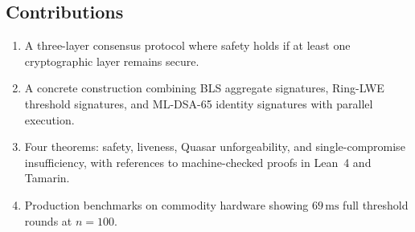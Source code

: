 \subsection{Contributions}

\begin{enumerate}[leftmargin=2em]
\item A three-layer consensus protocol where safety holds if at least one
      cryptographic layer remains secure.
\item A concrete construction combining BLS aggregate signatures, Ring-LWE
      threshold signatures, and ML-DSA-65 identity signatures with parallel
      execution.
\item Four theorems: safety, liveness, Quasar unforgeability, and
      single-compromise insufficiency, with references to machine-checked
      proofs in Lean~4 and Tamarin.
\item Production benchmarks on commodity hardware showing $69\,\text{ms}$
      full threshold rounds at $n=100$.
\end{enumerate}


